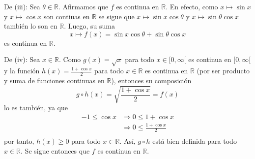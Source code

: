\documentclass[12pt]{article}
\begin{document}
\begin{enumerate}
\begin{sol}
        De (iii): Sea $\theta\in\mathbb{R}$. Afirmamos que $f$ es continua en $\mathbb{R}$. En efecto, como $x\mapsto \sin x$ y $x\mapsto \cos x$ son contiuas en $\mathbb{R}$ se sigue que $x\mapsto \sin x\cos\theta$ y $x\mapsto \sin\theta\cos x$ también lo son en $\mathbb{R}$. Luego, su suma
        \begin{equation*}
            x\mapsto f(x)=\sin x\cos\theta+\sin\theta\cos x
        \end{equation*}
        es continua en $\mathbb{R}$.

        De (iv): Sea $x\in\mathbb{R}$. Como $g(x)=\sqrt{x}$ para todo $x\in[0,\infty[$ es continua en $[0,\infty[$ y la función $h(x)=\frac{1+\cos x}{2}$ para todo $x\in\mathbb{R}$ es continua en $\mathbb{R}$ (por ser producto y suma de funciones continuas en $\mathbb{R}$), entonces su composición
        \begin{equation*}
            g\circ h(x)=\sqrt{\frac{1+\cos x}{2}}=f(x)
        \end{equation*}
        lo es también, ya que
        \begin{equation*}
            \begin{split}
                -1\leq \cos x&\Rightarrow0\leq 1+\cos x\\
                &\Rightarrow0\leq \frac{1+\cos x}{2} \\
            \end{split}
        \end{equation*}
        por tanto, $h(x)\geq 0$ para todo $x\in\mathbb{R}$. Así, $g\circ h$ está bien definida para todo $x\in\mathbb{R}$. Se sigue entonces que $f$ es continua en $\mathbb{R}$.
    \end{sol}

\end{enumerate}
\end{document}
